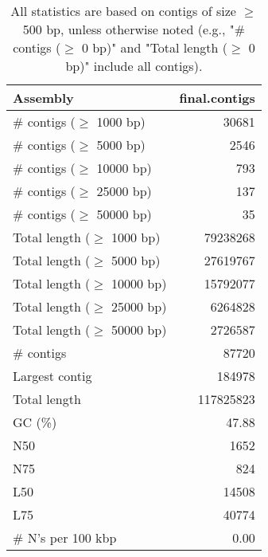 \documentclass[12pt,a4paper]{article}
\begin{document}
\begin{table}[ht]
\begin{center}
\caption{All statistics are based on contigs of size $\geq$ 500 bp, unless otherwise noted (e.g., "\# contigs ($\geq$ 0 bp)" and "Total length ($\geq$ 0 bp)" include all contigs).}
\begin{tabular}{|l*{1}{|r}|}
\hline
Assembly & final.contigs \\ \hline
\# contigs ($\geq$ 1000 bp) & 30681 \\ \hline
\# contigs ($\geq$ 5000 bp) & 2546 \\ \hline
\# contigs ($\geq$ 10000 bp) & 793 \\ \hline
\# contigs ($\geq$ 25000 bp) & 137 \\ \hline
\# contigs ($\geq$ 50000 bp) & 35 \\ \hline
Total length ($\geq$ 1000 bp) & 79238268 \\ \hline
Total length ($\geq$ 5000 bp) & 27619767 \\ \hline
Total length ($\geq$ 10000 bp) & 15792077 \\ \hline
Total length ($\geq$ 25000 bp) & 6264828 \\ \hline
Total length ($\geq$ 50000 bp) & 2726587 \\ \hline
\# contigs & 87720 \\ \hline
Largest contig & 184978 \\ \hline
Total length & 117825823 \\ \hline
GC (\%) & 47.88 \\ \hline
N50 & 1652 \\ \hline
N75 & 824 \\ \hline
L50 & 14508 \\ \hline
L75 & 40774 \\ \hline
\# N's per 100 kbp & 0.00 \\ \hline
\end{tabular}
\end{center}
\end{table}
\end{document}
